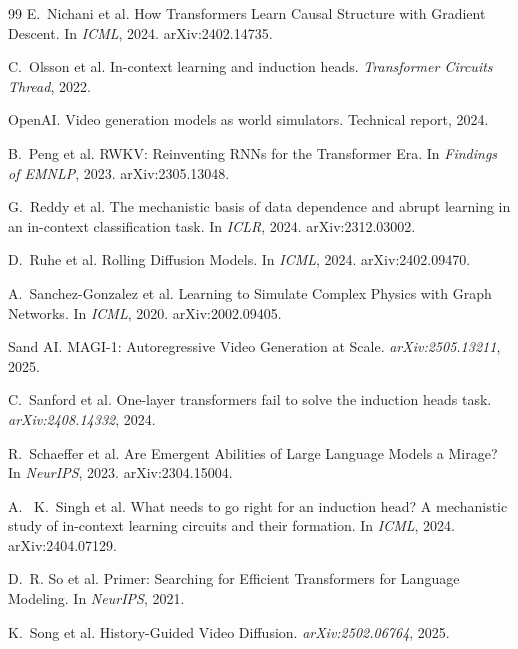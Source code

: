 \documentclass[11pt]{article}
\begin{document}
\begin{thebibliography}{99}
E.~Nichani et al.
How Transformers Learn Causal Structure with Gradient Descent. In \emph{ICML}, 2024. arXiv:2402.14735.

C.~Olsson et al.
In-context learning and induction heads.
\emph{Transformer Circuits Thread}, 2022.

OpenAI.
Video generation models as world simulators. Technical report, 2024.

B.~Peng et al.
RWKV: Reinventing RNNs for the Transformer Era. In \emph{Findings of EMNLP}, 2023. arXiv:2305.13048.

G.~Reddy et al.
The mechanistic basis of data dependence and abrupt learning in an in-context classification task. In \emph{ICLR}, 2024. arXiv:2312.03002.

D.~Ruhe et al.
Rolling Diffusion Models. In \emph{ICML}, 2024. arXiv:2402.09470.

A.~Sanchez-Gonzalez et al.
Learning to Simulate Complex Physics with Graph Networks. In \emph{ICML}, 2020. arXiv:2002.09405.

{Sand AI}.
MAGI-1: Autoregressive Video Generation at Scale. \emph{arXiv:2505.13211}, 2025.

C.~Sanford et al.
One-layer transformers fail to solve the induction heads task. \emph{arXiv:2408.14332}, 2024.

R.~Schaeffer et al.
Are Emergent Abilities of Large Language Models a Mirage? In \emph{NeurIPS}, 2023. arXiv:2304.15004.

A.~ K.~Singh et al.
What needs to go right for an induction head? A mechanistic study of in-context learning circuits and their formation. In \emph{ICML}, 2024. arXiv:2404.07129.

D.~R. So et al.
Primer: Searching for Efficient Transformers for Language Modeling. In \emph{NeurIPS}, 2021.

K.~Song et al.
History-Guided Video Diffusion. \emph{arXiv:2502.06764}, 2025.


\end{thebibliography}
\end{document}
